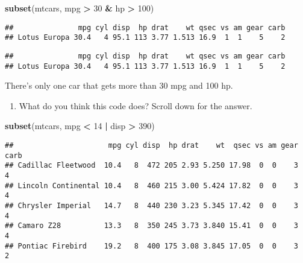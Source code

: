 \documentclass[]{article}
\newenvironment{Shaded}{\begin{snugshade}}{\end{snugshade}}
\newcommand{\KeywordTok}[1]{\textcolor[rgb]{0.13,0.29,0.53}{\textbf{#1}}}
\newcommand{\DecValTok}[1]{\textcolor[rgb]{0.00,0.00,0.81}{#1}}
\newcommand{\StringTok}[1]{\textcolor[rgb]{0.31,0.60,0.02}{#1}}
\newcommand{\OperatorTok}[1]{\textcolor[rgb]{0.81,0.36,0.00}{\textbf{#1}}}
\newcommand{\NormalTok}[1]{#1}
\providecommand{\tightlist}{%
  \setlength{\itemsep}{0pt}\setlength{\parskip}{0pt}}
\begin{document}
\begin{Shaded}
\begin{Highlighting}[]
\KeywordTok{subset}\NormalTok{(mtcars, mpg }\OperatorTok{>}\StringTok{ }\DecValTok{30} \OperatorTok{&}\StringTok{ }\NormalTok{hp }\OperatorTok{>}\StringTok{ }\DecValTok{100}\NormalTok{)}
\end{Highlighting}
\end{Shaded}

\begin{verbatim}
##               mpg cyl disp  hp drat    wt qsec vs am gear carb
## Lotus Europa 30.4   4 95.1 113 3.77 1.513 16.9  1  1    5    2
\end{verbatim}

\begin{Shaded}
\end{Shaded}

\begin{verbatim}
##               mpg cyl disp  hp drat    wt qsec vs am gear carb
## Lotus Europa 30.4   4 95.1 113 3.77 1.513 16.9  1  1    5    2
\end{verbatim}

There's only one car that gets more than 30 mpg and 100 hp.

\begin{enumerate}
\def\labelenumi{\arabic{enumi}.}
\setcounter{enumi}{4}
\tightlist
\item
  What do you think this code does? Scroll down for the answer.
\end{enumerate}

\begin{Shaded}
\begin{Highlighting}[]
\KeywordTok{subset}\NormalTok{(mtcars, mpg }\OperatorTok{<}\StringTok{ }\DecValTok{14} \OperatorTok{|}\StringTok{ }\NormalTok{disp }\OperatorTok{>}\StringTok{ }\DecValTok{390}\NormalTok{)}
\end{Highlighting}
\end{Shaded}

\begin{verbatim}
##                      mpg cyl disp  hp drat    wt  qsec vs am gear carb
## Cadillac Fleetwood  10.4   8  472 205 2.93 5.250 17.98  0  0    3    4
## Lincoln Continental 10.4   8  460 215 3.00 5.424 17.82  0  0    3    4
## Chrysler Imperial   14.7   8  440 230 3.23 5.345 17.42  0  0    3    4
## Camaro Z28          13.3   8  350 245 3.73 3.840 15.41  0  0    3    4
## Pontiac Firebird    19.2   8  400 175 3.08 3.845 17.05  0  0    3    2
\end{verbatim}
\end{document}

